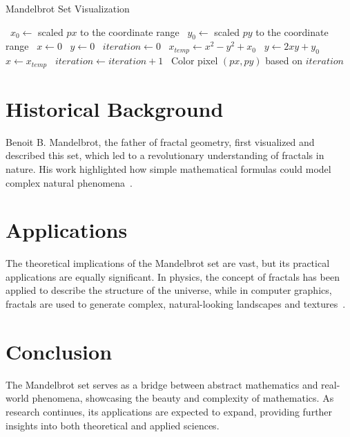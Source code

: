 \documentclass[12pt]{article}
\begin{document}
\begin{algorithm}
\caption{Mandelbrot Set Visualization}
\begin{algorithmic}[1]
        \State~$x_0 \gets$ scaled $px$ to the coordinate range
        \State~$y_0 \gets$ scaled $py$ to the coordinate range
        \State~$x \gets 0$
        \State~$y \gets 0$
        \State~$iteration \gets 0$
            \State~$x_{temp} \gets x^2 - y^2 + x_0$
            \State~$y \gets 2xy + y_0$
            \State~$x \gets x_{temp}$
            \State~$iteration \gets iteration + 1$
        \EndWhile
        \State~Color pixel $(px, py)$ based on $iteration$
    \EndFor
\EndProcedure
\end{algorithmic}
\end{algorithm}

\section{Historical Background}
Benoit B. Mandelbrot, the father of fractal geometry, first visualized and described this set, which led to a revolutionary understanding of fractals in nature. His work highlighted how simple mathematical formulas could model complex natural phenomena~\cite{mandelbrot1982}.

\section{Applications}
The theoretical implications of the Mandelbrot set are vast, but its practical applications are equally significant. In physics, the concept of fractals has been applied to describe the structure of the universe, while in computer graphics, fractals are used to generate complex, natural-looking landscapes and textures~\cite{peitgen1992}.

\section{Conclusion}
The Mandelbrot set serves as a bridge between abstract mathematics and real-world phenomena, showcasing the beauty and complexity of mathematics. As research continues, its applications are expected to expand, providing further insights into both theoretical and applied sciences.



\end{document}
